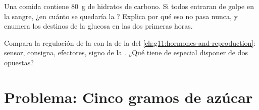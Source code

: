 \begin{exercise}[$\star\star\star$]\label{exo:g12:glucose-and-diabetes:14}
Una comida contiene \qty{80}{g} de hidratos de carbono. Si todos
entraran de golpe en la sangre, ¿en cuánto se quedaría la ?
Explica por qué eso no pasa nunca, y enumera los destinos de la glucosa
en las dos primeras horas.
\end{exercise}

\begin{exercise}[$\star\star\star$]\label{exo:g12:glucose-and-diabetes:15}
Compara la regulación de la  con la de la  del
\cref{ch:g11:hormones-and-reproduction}: sensor, consigna, efectores,
signo de la . ¿Qué tiene de especial disponer de dos
 opuestas?
\end{exercise}

\section{Problema: Cinco gramos de azúcar}


